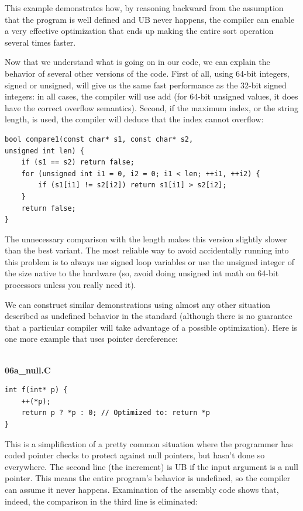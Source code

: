 This example demonstrates how, by reasoning backward from the assumption that the program is well defined and UB never happens, the compiler can enable a very effective optimization that ends up making the entire sort operation several times faster.

Now that we understand what is going on in our code, we can explain the behavior of several other versions of the code. First of all, using 64-bit integers, signed or unsigned, will give us the same fast performance as the 32-bit signed integers: in all cases, the compiler will use add (for 64-bit unsigned values, it does have the correct overflow semantics). Second, if the maximum index, or the string length, is used, the compiler will deduce that the index cannot overflow:

\begin{lstlisting}[style=styleCXX]
bool compare1(const char* s1, const char* s2,
unsigned int len) {
	if (s1 == s2) return false;
	for (unsigned int i1 = 0, i2 = 0; i1 < len; ++i1, ++i2) {
		if (s1[i1] != s2[i2]) return s1[i1] > s2[i2];
	}
	return false;
}
\end{lstlisting}

The unnecessary comparison with the length makes this version slightly slower than the best variant. The most reliable way to avoid accidentally running into this problem is to always use signed loop variables or use the unsigned integer of the size native to the hardware (so, avoid doing unsigned int math on 64-bit processors unless you really need it).

We can construct similar demonstrations using almost any other situation described as undefined behavior in the standard (although there is no guarantee that a particular compiler will take advantage of a possible optimization). Here is one more example that uses pointer dereference:

\hspace*{\fill} \\ %
\noindent
\textbf{06a\_null.C}
\begin{lstlisting}[style=styleCXX]
int f(int* p) {
	++(*p);
	return p ? *p : 0; // Optimized to: return *p
}
\end{lstlisting}

This is a simplification of a pretty common situation where the programmer has coded pointer checks to protect against null pointers, but hasn't done so everywhere. The second line (the increment) is UB if the input argument is a null pointer. This means the entire program's behavior is undefined, so the compiler can assume it never happens. Examination of the assembly code shows that, indeed, the comparison in the third line is eliminated:

